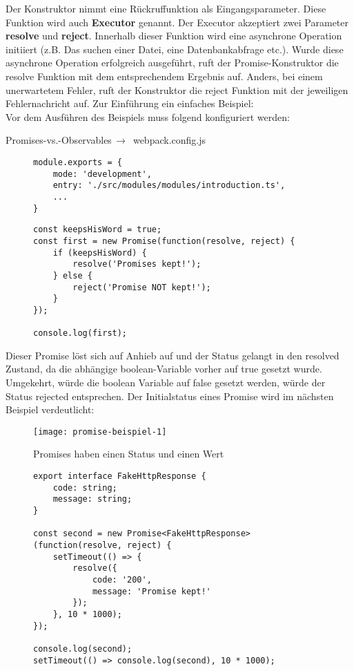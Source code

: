 Der Konstruktor nimmt eine Rückruffunktion als Eingangsparameter. Diese Funktion wird auch \textbf{Executor} genannt.\cite{promise-executor} Der Executor akzeptiert zwei Parameter \textbf{resolve} und \textbf{reject}. Innerhalb dieser Funktion wird eine asynchrone Operation initiiert (z.B. Das suchen einer Datei, eine Datenbankabfrage etc.). Wurde diese asynchrone Operation erfolgreich ausgeführt, ruft der Promise-Konstruktor die resolve Funktion mit dem entsprechendem Ergebnis auf. Anders, bei einem unerwartetem Fehler, ruft der Konstruktor die reject Funktion mit der jeweiligen Fehlernachricht auf. Zur Einführung ein einfaches Beispiel:\\

\noindent
Vor dem Ausführen des Beispiels muss folgend konfiguriert werden:

 \begin{center}
     Promises-vs.-Observables$\,\to\,$ webpack.config.js
 \end{center}

\begin{figure}[H]
\begin{lstlisting}
module.exports = {
    mode: 'development',
    entry: './src/modules/modules/introduction.ts',
    ...
}
\end{lstlisting}
\end{figure}

\begin{figure}[H]
\begin{lstlisting}
const keepsHisWord = true;
const first = new Promise(function(resolve, reject) {
    if (keepsHisWord) {
        resolve('Promises kept!');
    } else {
        reject('Promise NOT kept!');
    }
});

console.log(first);
\end{lstlisting}
\end{figure}

\noindent
Dieser Promise löst sich auf Anhieb auf und der Status gelangt in den resolved Zustand, da die abhängige boolean-Variable vorher auf true gesetzt wurde. Umgekehrt, würde die boolean Variable auf false gesetzt werden, würde der Status rejected entsprechen. Der Initialstatus eines Promise wird im nächsten Beispiel verdeutlicht:

\begin{figure}[H]
\centering
\texttt{[image: promise-beispiel-1]}
\caption{Promises haben einen Status und einen Wert}
\end{figure}

\begin{figure}[H]
\begin{lstlisting}
export interface FakeHttpResponse {
    code: string;
    message: string;
}

const second = new Promise<FakeHttpResponse>(function(resolve, reject) {
    setTimeout(() => {
        resolve({
            code: '200',
            message: 'Promise kept!'
        });
    }, 10 * 1000);
});

console.log(second);
setTimeout(() => console.log(second), 10 * 1000);
\end{lstlisting}
\end{figure}

